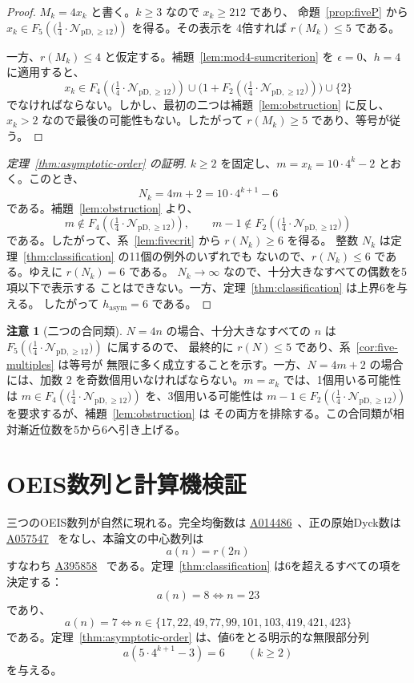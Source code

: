 \documentclass[12pt]{ltjsarticle}
\theoremstyle{plain}
\theoremstyle{definition}
\newtheorem{remark}[theorem]{注意}
\theoremstyle{plain}
\newcommand{\Pset}{%
  \bigl(\tfrac{1}{4}\cdot\mathcal{N}_{\mathrm{pD},\geq 12}\bigr)%
}
\newcommand{\seqnum}[1]{\href{https://oeis.org/#1}{\textrm{\underline{#1}}}}
\begin{document}
\begin{proof}
$M_k=4x_k$ と書く。$k\geq3$ なので $x_k\geq212$ であり、
命題~\ref{prop:fiveP} から $x_k\in F_5(\Pset)$ を得る。その表示を
4倍すれば $r(M_k)\leq5$ である。

一方、$r(M_k)\leq4$ と仮定する。補題~\ref{lem:mod4-sumcriterion} を
$\epsilon=0$、$h=4$ に適用すると、
\[
 x_k\in F_4(\Pset)
 \cup\bigl(1+F_2(\Pset)\bigr)
 \cup\{2\}
\]
でなければならない。しかし、最初の二つは補題~\ref{lem:obstruction}
に反し、$x_k>2$ なので最後の可能性もない。したがって
$r(M_k)\geq5$ であり、等号が従う。
\end{proof}

\begin{proof}[定理~\ref{thm:asymptotic-order} の証明]
$k\geq2$ を固定し、$m=x_k=10\cdot4^k-2$ とおく。このとき、
\[
 N_k=4m+2=10\cdot4^{k+1}-6
\]
である。補題~\ref{lem:obstruction} より、
\[
 m\notin F_4(\Pset),
 \qquad
 m-1\notin F_2(\Pset)
\]
である。したがって、系~\ref{lem:fivecrit} から $r(N_k)\geq6$ を得る。
整数 $N_k$ は定理~\ref{thm:classification} の11個の例外のいずれでも
ないので、$r(N_k)\leq6$ である。ゆえに $r(N_k)=6$ である。
$N_k\to\infty$ なので、十分大きなすべての偶数を5項以下で表示する
ことはできない。一方、定理~\ref{thm:classification} は上界6を与える。
したがって $h_{\mathrm{asym}}=6$ である。
\end{proof}

\begin{remark}[二つの合同類]
$N=4n$ の場合、十分大きなすべての $n$ は $F_5(\Pset)$ に属するので、
最終的に $r(N)\leq5$ であり、系~\ref{cor:five-multiples} は等号が
無限に多く成立することを示す。一方、$N=4m+2$ の場合には、加数 $2$
を奇数個用いなければならない。$m=x_k$ では、1個用いる可能性は
$m\in F_4(\Pset)$ を、3個用いる可能性は
$m-1\in F_2(\Pset)$ を要求するが、補題~\ref{lem:obstruction} は
その両方を排除する。この合同類が相対漸近位数を5から6へ引き上げる。
\end{remark}

\section{OEIS数列と計算機検証}
\label{sec:oeis}

三つのOEIS数列が自然に現れる。完全均衡数は \seqnum{A014486}~\cite{OEIS-A014486}、正の原始Dyck数は \seqnum{A057547}~\cite{OEIS-A057547} をなし、本論文の中心数列は
\[
  a(n)=r(2n)
\]
すなわち \seqnum{A395858}~\cite{OEIS-A395858} である。定理~\ref{thm:classification} は6を超えるすべての項を決定する：
\[
  a(n)=8\iff n=23
\]
であり、
\[
  a(n)=7\iff
  n\in\{17,22,49,77,99,101,103,419,421,423\}
\]
である。定理~\ref{thm:asymptotic-order} は、値6をとる明示的な無限部分列
\begin{equation}\label{eq:A395858-six-subsequence}
  a(5\cdot4^{k+1}-3)=6\qquad(k\geq2)
\end{equation}
を与える。
\end{document}
